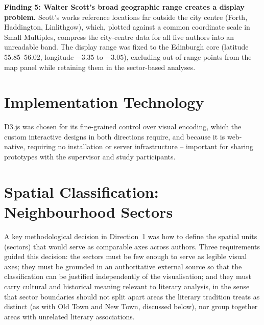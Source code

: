 \documentclass[logo,msc]{infthesis}
\begin{document}
\textbf{Finding 5: Walter Scott's broad geographic range creates a display problem.} Scott's works reference locations far outside the city centre (Forth, Haddington, Linlithgow), which, plotted against a common coordinate scale in Small Multiples, compress the city-centre data for all five authors into an unreadable band. The display range was fixed to the Edinburgh core (latitude 55.85--56.02, longitude $-3.35$ to $-3.05$), excluding out-of-range points from the map panel while retaining them in the sector-based analyses.

\section{Implementation Technology}

D3.js \cite{bostock2011} was chosen for its fine-grained control over visual encoding, which the custom interactive designs in both directions require, and because it is web-native, requiring no installation or server infrastructure -- important for sharing prototypes with the supervisor and study participants.
 
\section{Spatial Classification: Neighbourhood Sectors}
\label{sec:sectors}
 
A key methodological decision in Direction~1 was how to define the spatial units (sectors) that would serve as comparable axes across authors. Three requirements guided this decision: the sectors must be few enough to serve as legible visual axes; they must be grounded in an authoritative external source so that the classification can be justified independently of the visualisation; and they must carry cultural and historical meaning relevant to literary analysis, in the sense that sector boundaries should not split apart areas the literary tradition treats as distinct (as with Old Town and New Town, discussed below), nor group together areas with unrelated literary associations.
 
\end{document}
